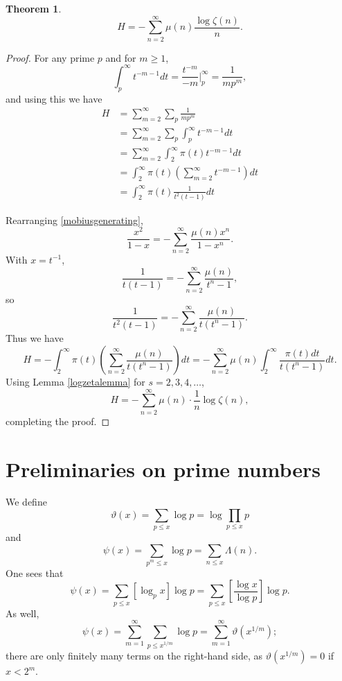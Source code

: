 \documentclass{amsart}
\newtheorem{theorem}{Theorem}
\begin{document}
\begin{theorem}
\[
H=-\sum_{n=2}^\infty \mu(n) \frac{\log \zeta(n)}{n}.
\]
\end{theorem}
\begin{proof}
For any prime $p$ and for $m \geq 1$,
\[
\int_p^\infty t^{-m-1} dt  = 
\frac{t^{-m}}{-m} \bigg|_p^\infty =
\frac{1}{mp^m}, 
\]
and using this we have
\begin{align*}
H&=\sum_{m=2}^\infty \sum_p \frac{1}{mp^m}\\
&=\sum_{m=2}^\infty \sum_p \int_p^\infty t^{-m-1} dt \\
&=\sum_{m=2}^\infty \int_2^\infty \pi(t) t^{-m-1} dt  \\
&=\int_2^\infty \pi(t) \left( \sum_{m=2}^\infty t^{-m-1}\right) dt\\
&=\int_2^\infty \pi(t) \frac{1}{t^2(t-1)}  dt
\end{align*}

Rearranging \eqref{mobiusgenerating}, 
\[
\frac{x^2}{1-x}=
-\sum_{n=2}^\infty  \frac{\mu(n) x^n}{1-x^n}.
\]
With $x=t^{-1}$,
\[
\frac{1}{t(t-1)} = -\sum_{n=2}^\infty \frac{\mu(n)}{t^n-1},
\]
so
\[
\frac{1}{t^2(t-1)} = -\sum_{n=2}^\infty \frac{\mu(n)}{t(t^n-1)}.
\]
Thus we have
\[
H=-\int_2^\infty \pi(t) \left( \sum_{n=2}^\infty \frac{\mu(n)}{t(t^n-1)}\right) dt
=-\sum_{n=2}^\infty \mu(n) \int_2^\infty \frac{\pi(t) dt}{t(t^n-1)} dt.
\]
Using  Lemma \ref{logzetalemma} for $s=2,3,4,\ldots$,
\[
H=-\sum_{n=2}^\infty \mu(n) \cdot \frac{1}{n} \log \zeta(n),
\]
completing the proof.
\end{proof}




\section{Preliminaries on prime numbers}
We define
\[
\vartheta(x) = \sum_{p \leq x} \log p = \log \prod_{p \leq x} p
\]
and
\[
\psi(x) = \sum_{p^m \leq x} \log p = \sum_{n \leq x} \Lambda(n).
\]
One sees that
\[
\psi(x) = \sum_{p \leq x} [\log_p x] \log p = 
\sum_{p \leq x} \left[ \frac{\log x}{\log p}\right] \log p.
\]
As well,
\begin{equation}
\psi(x)
= 
\sum_{m=1}^\infty \sum_{p \leq x^{1/m}} \log p
=
\sum_{m=1}^\infty \vartheta(x^{1/m});
\label{thetasum}
\end{equation}
there are only finitely many terms on the right-hand side, as $\vartheta(x^{1/m})=0$ if
$x<2^m$.
\end{document}
